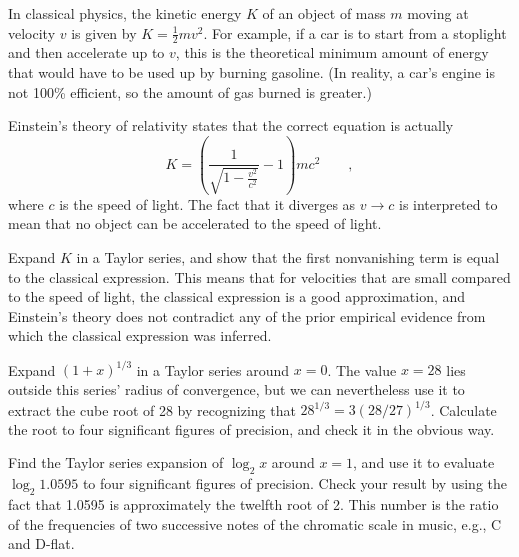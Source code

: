 \begin{hwsection}
\begin{hw}
In classical physics, the kinetic energy $K$ of an object of mass $m$ moving at velocity $v$
is given by $K=\frac{1}{2}mv^2$. For example, if a car is to start from a stoplight and then
accelerate up to $v$, this is
the theoretical minimum amount of energy  that would have to be used up by burning gasoline.
(In reality, a car's engine is not 100\% efficient, so the amount of gas burned is greater.)

Einstein's theory of relativity states that the correct equation is actually
\begin{equation*}
  K = \left(\frac{1}{\sqrt{1-\frac{v^2}{c^2}}}-1\right)mc^2 \qquad ,
\end{equation*}
where $c$ is the speed of light. The fact that it diverges as $v \rightarrow c$ is interpreted
to mean that no object can be accelerated to the speed of light.

Expand $K$ in a Taylor series, and show that the first
nonvanishing term is equal to the classical expression. This means that for velocities that
are small compared to the speed of light, the classical expression is a good approximation,
and Einstein's theory does not contradict any of the prior empirical evidence from which
the classical expression was inferred.
\end{hw}

\begin{hw}
Expand $(1+x)^{1/3}$ in a Taylor series around $x=0$. The value $x=28$ lies outside
this series' radius of convergence, but we can nevertheless use it to
extract the cube root of 28 by recognizing that $28^{1/3}=3(28/27)^{1/3}$.
Calculate the root to four significant figures of precision, and check it
in the obvious way.
\end{hw}

\begin{hw}
Find the Taylor series expansion of $\log_2 x$ around $x=1$, and use it to evaluate
$\log_2 1.0595$ to four significant figures of precision. Check your result by using the
fact that 1.0595 is approximately the twelfth root of 2. This number is the ratio of
the frequencies of two successive notes of the chromatic scale
in music, e.g., C and D-flat.
\end{hw}


\end{hwsection}
